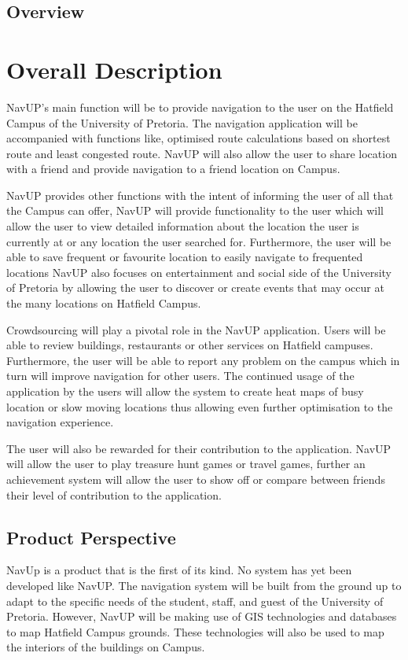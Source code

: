 \documentclass[12pt,a4paper]{article}
\begin{document}
	\subsection{Overview}
\section{Overall Description}
NavUP's main function will be to provide navigation to the user on the Hatfield Campus of the University of Pretoria. The navigation application will be accompanied with functions like, optimised route calculations based on shortest route and least congested route. NavUP will also allow the user to share location with a friend and provide navigation to a friend location on Campus.\newline

NavUP provides other functions with the intent of informing the user of all that the Campus can offer, NavUP will provide functionality to the user which will allow the user to view detailed information about the location the user is currently at or any location the user searched for. Furthermore, the user will be able to save frequent or favourite location to easily navigate to frequented locations
NavUP also focuses on entertainment and social side of the University of Pretoria by allowing the user to discover or create events that may occur at the many locations on Hatfield Campus.\newline

Crowdsourcing will play a pivotal role in the NavUP application. Users will be able to review buildings, restaurants or other services on Hatfield campuses. Furthermore, the user will be able to report any problem on the campus which in turn will improve navigation for other users. The continued usage of the application by the users will allow the system to create heat maps of busy location or slow moving locations thus allowing even further optimisation to the navigation experience.\newline

The user will also be rewarded for their contribution to the application. NavUP will allow the user to play treasure hunt games or travel games, further an achievement system will allow the user to show off or compare between friends their level of contribution to the application.\newline
	\subsection{Product Perspective}
		NavUp is a product that is the first of its kind. No system has yet been developed like NavUP. The navigation system will be built from the ground up to adapt to the specific needs of the student, staff, and guest of the University of Pretoria. However, NavUP will be making use of GIS technologies and databases to map Hatfield Campus grounds. These technologies will also be used to map the interiors of the buildings on Campus.\newline
\end{document}
